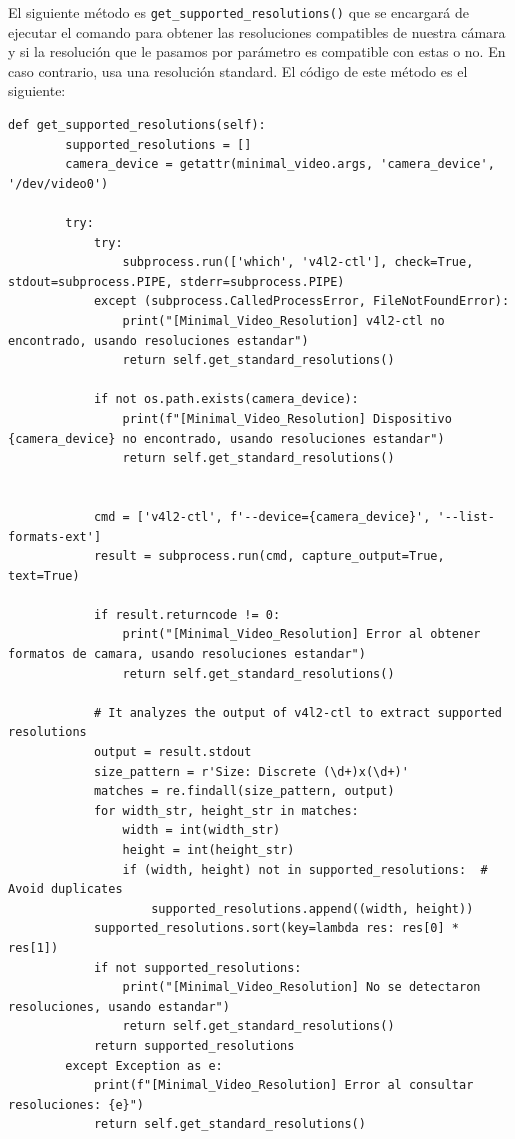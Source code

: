 El siguiente método es \texttt{get\_supported\_resolutions()} que se encargará de ejecutar el comando para obtener las resoluciones compatibles de nuestra cámara y si la resolución que le pasamos por parámetro es compatible con estas o no. En caso contrario, usa una resolución standard. El código de este método es el siguiente:
\begin{lstlisting}[style=pythonstyle, caption={\texttt{get\_supported\_resolutions()} de \textit{Minimal\_Video\_Resolution}.}, label={lst:get_supported_resolution_minimal_video_resolution}]
def get_supported_resolutions(self):
        supported_resolutions = []
        camera_device = getattr(minimal_video.args, 'camera_device', '/dev/video0')
        
        try:
            try:
                subprocess.run(['which', 'v4l2-ctl'], check=True, stdout=subprocess.PIPE, stderr=subprocess.PIPE)
            except (subprocess.CalledProcessError, FileNotFoundError):
                print("[Minimal_Video_Resolution] v4l2-ctl no encontrado, usando resoluciones estandar")
                return self.get_standard_resolutions()
                
            if not os.path.exists(camera_device):
                print(f"[Minimal_Video_Resolution] Dispositivo {camera_device} no encontrado, usando resoluciones estandar")
                return self.get_standard_resolutions()
            
            
            cmd = ['v4l2-ctl', f'--device={camera_device}', '--list-formats-ext']
            result = subprocess.run(cmd, capture_output=True, text=True)
            
            if result.returncode != 0:
                print("[Minimal_Video_Resolution] Error al obtener formatos de camara, usando resoluciones estandar")
                return self.get_standard_resolutions()
            
            # It analyzes the output of v4l2-ctl to extract supported resolutions
            output = result.stdout
            size_pattern = r'Size: Discrete (\d+)x(\d+)'
            matches = re.findall(size_pattern, output)
            for width_str, height_str in matches:
                width = int(width_str)
                height = int(height_str)
                if (width, height) not in supported_resolutions:  # Avoid duplicates
                    supported_resolutions.append((width, height))
            supported_resolutions.sort(key=lambda res: res[0] * res[1])
            if not supported_resolutions:
                print("[Minimal_Video_Resolution] No se detectaron resoluciones, usando estandar")
                return self.get_standard_resolutions()
            return supported_resolutions
        except Exception as e:
            print(f"[Minimal_Video_Resolution] Error al consultar resoluciones: {e}")
            return self.get_standard_resolutions()
\end{lstlisting}
\vspace{\baselineskip}

